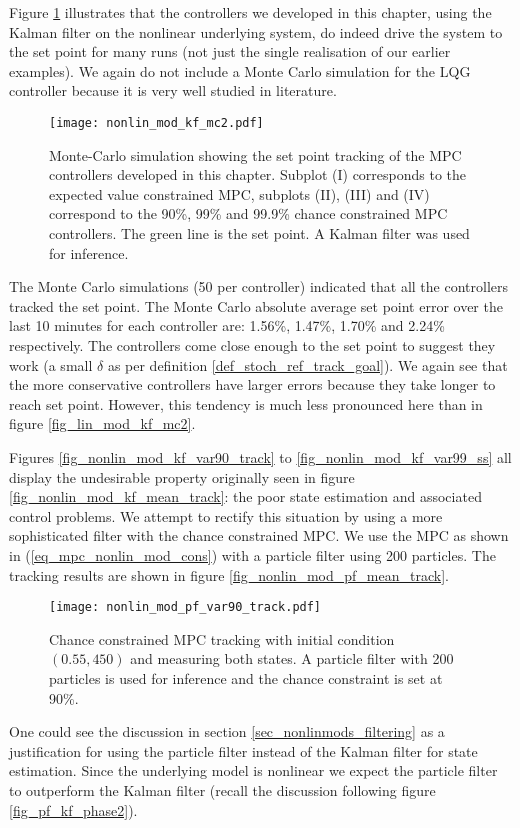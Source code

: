 Figure \ref{fig_nonlin_mod_kf_mc2} illustrates that the controllers we developed in this chapter, using the Kalman filter on the nonlinear underlying system, do indeed drive the system to the set point for many runs (not just the single realisation of our earlier examples). We again do not include a Monte Carlo simulation for the LQG controller because it is very well studied in literature.
\begin{figure}[H] 
\centering
\texttt{[image: nonlin\_mod\_kf\_mc2.pdf]}
\caption{Monte-Carlo simulation showing the set point tracking of the MPC controllers developed in this chapter. Subplot (I) corresponds to the expected value constrained MPC, subplots (II), (III) and (IV) correspond to the 90\%, 99\% and 99.9\% chance constrained MPC controllers. The green line is the set point. A Kalman filter was used for inference.}
\label{fig_nonlin_mod_kf_mc2}
\end{figure}
The Monte Carlo simulations (50 per controller) indicated that all the controllers tracked the set point. The Monte Carlo absolute average set point error over the last 10 minutes for each controller are: 1.56\%, 1.47\%, 1.70\% and 2.24\% respectively. The controllers come close enough to the set point to suggest they work (a small $\delta$ as per definition \ref{def_stoch_ref_track_goal}). We again see that the more conservative controllers have larger errors because they take longer to reach set point. However, this tendency is much less pronounced here than in figure \ref{fig_lin_mod_kf_mc2}.

Figures \ref{fig_nonlin_mod_kf_var90_track} to \ref{fig_nonlin_mod_kf_var99_ss} all display the undesirable property originally seen in figure \ref{fig_nonlin_mod_kf_mean_track}: the poor state estimation and associated control problems. We attempt to rectify this situation by using a more sophisticated filter with the chance constrained MPC. We use the MPC as shown in (\ref{eq_mpc_nonlin_mod_cons}) with a particle filter using 200 particles. The tracking results are shown in figure \ref{fig_nonlin_mod_pf_mean_track}. 
\begin{figure}[H] 
\centering
\texttt{[image: nonlin\_mod\_pf\_var90\_track.pdf]}
\caption{Chance constrained MPC tracking with initial condition $(0.55, 450)$ and measuring both states. A particle filter with 200 particles is used for inference and the chance constraint is set at 90\%.}
\label{fig_nonlin_mod_pf_var90_track}
\end{figure}
One could see the discussion in section \ref{sec_nonlinmods_filtering} as a justification for using the particle filter instead of the Kalman filter for state estimation. Since the underlying model is nonlinear we expect the particle filter to outperform the Kalman filter (recall the discussion following figure \ref{fig_pf_kf_phase2}).

